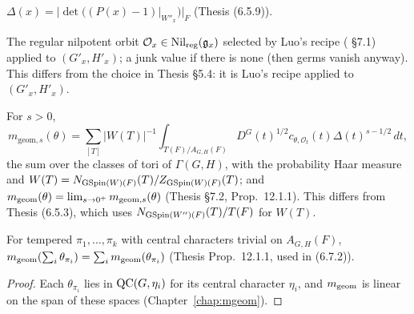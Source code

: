 \begin{definition}
\label{deltaGGP}
\leanok
{}
$\Delta(x)=|\det((P(x)-1)|_{W''_x})|_F$ (Thesis (6.5.9)).
\end{definition}

\begin{definition}
\label{orbitChoice}
\leanok
{}
The regular nilpotent orbit $\mathcal O_x\in\mathrm{Nil}_{\mathrm{reg}}(\mathfrak g_x)$ selected by Luo's recipe (\cite{Luo} \S7.1)
applied to $(G'_x,H'_x)$; a junk value if there is none (then germs vanish anyway).
This differs from the choice in Thesis \S5.4: it is Luo's recipe applied to $(G'_x,H'_x)$.
\end{definition}

\begin{definition}
\label{mGeom}
\leanok
{}
For $s>0$,
\[ m_{\mathrm{geom},s}(\theta)=\sum_{[T]}|W(T)|^{-1}\int_{T(F)/A_{G,H}(F)}D^G(t)^{1/2}c_{\theta,\mathcal O_t}(t)\Delta(t)^{s-1/2}\,dt, \]
the sum over the classes of tori of $\Gamma(G,H)$, with the probability Haar measure and
$W(T)=N_{\mathrm{GSpin}(W)(F)}(T)/Z_{\mathrm{GSpin}(W)(F)}(T)$; and $m_{\mathrm{geom}}(\theta)=\lim_{s\to0^+}m_{\mathrm{geom},s}(\theta)$
(Thesis \S7.2, Prop.~12.1.1). This differs from Thesis (6.5.3), which uses $N_{\mathrm{GSpin}(W'')(F)}(T)/T(F)$ for $W(T)$.
\end{definition}

\begin{proposition}
\label{mGeom_finset_sum}
\leanok
{}
For tempered $\pi_1,\dots,\pi_k$ with central characters trivial on $A_{G,H}(F)$,
$m_{\mathrm{geom}}(\sum_i\theta_{\pi_i})=\sum_im_{\mathrm{geom}}(\theta_{\pi_i})$ (Thesis Prop.~12.1.1, used in (6.7.2)).
\end{proposition}
\begin{proof}
\leanok
{}
Each $\theta_{\pi_i}$ lies in $\mathrm{QC}(G,\eta_i)$ for its central character $\eta_i$, and $m_{\mathrm{geom}}$ is linear on the
span of these spaces (Chapter~\ref{chap:mgeom}).
\end{proof}

